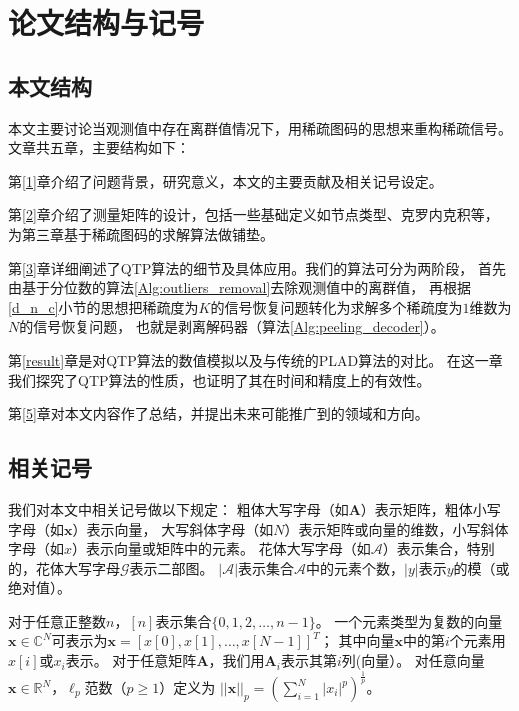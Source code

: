 \documentclass[AutoFakeBold]{LZUThesis}
\begin{document}
\section{论文结构与记号}

\subsection{本文结构}

本文主要讨论当观测值中存在离群值情况下，用稀疏图码的思想来重构稀疏信号。文章共五章，主要结构如下：

第\ref{1}章介绍了问题背景，研究意义，本文的主要贡献及相关记号设定。

第\ref{2}章介绍了测量矩阵的设计，包括一些基础定义如节点类型、克罗内克积等，为第三章基于稀疏图码的求解算法做铺垫。

第\ref{3}章详细阐述了QTP算法的细节及具体应用。我们的算法可分为两阶段，
首先由基于分位数的算法\ref{Alg:outliers_removal}去除观测值中的离群值，
再根据\ref{d_n_c}小节的思想把稀疏度为$K$的信号恢复问题转化为求解多个稀疏度为$1$维数为$N$的信号恢复问题，
也就是剥离解码器（算法\ref{Alg:peeling_decoder}）。

第\ref{result}章是对QTP算法的数值模拟以及与传统的PLAD算法的对比。
在这一章我们探究了QTP算法的性质，也证明了其在时间和精度上的有效性。

第\ref{5}章对本文内容作了总结，并提出未来可能推广到的领域和方向。

\subsection{相关记号}

我们对本文中相关记号做以下规定：
粗体大写字母（如$\mathbf{A}$）表示矩阵，粗体小写字母（如$\mathbf{x}$）表示向量，
大写斜体字母（如$N$）表示矩阵或向量的维数，小写斜体字母（如$x$）表示向量或矩阵中的元素。
花体大写字母（如$\mathcal{A}$）表示集合，特别的，花体大写字母$\mathcal{G}$表示二部图。
$|\mathcal{A}|$表示集合$\mathcal{A}$中的元素个数，$|y|$表示$y$的模（或绝对值）。

对于任意正整数$n$，$[n]$表示集合$\{0, 1, 2, \dots, n-1\}$。
一个元素类型为复数的向量$\mathbf{x} \in \mathbb{C}^{N}$可表示为$\mathbf{x} = [x[0], x[1], \dots, x[N-1]]^T$；
其中向量$\mathbf{x}$中的第$i$个元素用$x[i]$或$x_i$表示。
对于任意矩阵$\mathbf{A}$，我们用$\mathbf{A}_i$表示其第$i$列(向量）。
对任意向量$\mathbf{x} \in \mathbb{R}^N$，$\ell_p$范数（$p \geq 1$）定义为
$||\mathbf{x}||_p = (\sum_{i=1}^N |x_i|^p)^{\frac{1}{p}}$。


\end{document}
